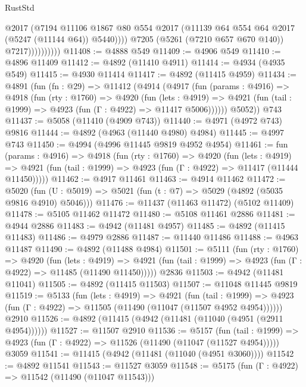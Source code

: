 \begin{lexlean}{RustStd}
\begin{coremodule}
                            @2017
                            (@7194
                              @11106
                              @1867
                              @80
                              @554
                              @2017
                              (@11139 @64 @554 @64 @2017 (@5247 (@11144 @64)) @5440))))
                        @7205
                        (@5261 (@7210 @657 @670 @140))
                        @7217))))))))))
@11408 := @4888 @549
@11409 := @4906 @549
@11410 := @4896 @11409
@11412 := @4892 (@11410 @4911)
@11414 := @4934 (@4935 @549)
@11415 := @4930 @11414
@11417 := @4892 (@11415 @4959)
@11434 := @4891
    (fun (fn : @29) =>
    @11412
      (@4914
        (@4917
          (fun (params : @4916) =>
          @4918
            (fun (rty : @1760) =>
            @4920
              (fun (lets : @4919) =>
              @4921 (fun (tail : @1999) => @4923 (fun (Γ : @4922) => @11417 @5006))))))
        @5052))
    @743
@11437 := @5058 (@11410 (@4909 @743))
@11440 := @4971 (@4972 @743) @9816
@11444 := @4892 (@4963 (@11440 @4980) @4984)
@11445 := @4997 @743
@11450 := @4994 (@4996 @11445 @9819 @4952 @4954)
@11461 := fun (params : @4916) =>
  @4918
    (fun (rty : @1760) =>
    @4920
      (fun (lets : @4919) =>
      @4921 (fun (tail : @1999) => @4923 (fun (Γ : @4922) => @11417 (@11444 @11450)))))
@11462 := @4917 @11461
@11463 := @4914 @11462
@11472 := @5020 (fun (U : @5019) => @5021 (fun (t : @7) => @5029 (@4892 (@5035 @9816 @4910) @5046)))
@11476 := @11437 (@11463 @11472) (@5102 @11409)
@11478 := @5105 @11462 @11472
@11480 := @5108 @11461 @2886
@11481 := @4944 @2886
@11483 := @4942 (@11481 @4957)
@11485 := @4892 (@11415 @11483)
@11486 := @4979 @2886
@11487 := @11440 @11486
@11488 := @4963 @11487
@11490 := @4892 (@11488 @4984)
@11501 := @5111
    (fun (rty : @1760) =>
    @4920
      (fun (lets : @4919) =>
      @4921 (fun (tail : @1999) => @4923 (fun (Γ : @4922) => @11485 (@11490 @11450)))))
    @2836
@11503 := @4942 (@11481 @11041)
@11505 := @4892 (@11415 @11503)
@11507 := @11048 @11445 @9819
@11519 := @5133
    (fun (lets : @4919) =>
    @4921
      (fun (tail : @1999) =>
      @4923 (fun (Γ : @4922) => @11505 (@11490 (@11047 (@11507 @4952 @4954))))))
    @2910
@11526 := @4892 (@11415 (@4942 (@11481 (@11040 (@4951 (@2911 @4954))))))
@11527 := @11507 @2910
@11536 := @5157
    (fun (tail : @1999) => @4923 (fun (Γ : @4922) => @11526 (@11490 (@11047 (@11527 @4954)))))
    @3059
@11541 := @11415 (@4942 (@11481 (@11040 (@4951 @3060))))
@11542 := @4892 @11541
@11543 := @11527 @3059
@11548 := @5175 (fun (Γ : @4922) => @11542 (@11490 (@11047 @11543)))

\end{coremodule}
\end{lexlean}

